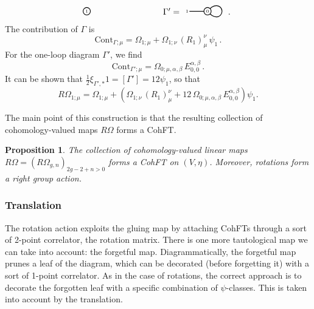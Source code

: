 \documentclass[11pt,reqno]{amsart}
\numberwithin{equation}{section}
\newcommand{\mr}[1]{\mathrm{#1}}
\theoremstyle{plain}
\newtheorem{proposition}[theorem]{Proposition}
\theoremstyle{definition}
\begin{document}
\begin{itemize}
\begin{equation}
\begin{tikzpicture}[baseline,scale=.5]
      \draw[thick,fill=white] (0,0) circle[radius=.3cm];
      \node at (0,0) {\tiny$1$};

      \begin{scope}[xshift = 10cm]
        \node at (-3,0) {$\Gamma'=$};
        \draw[thick] (0,0) -- (180:1.5);
        \node at (180:1.7) {\tiny$1$};
      
        \draw[thick,rotate=-90] (0,0) to[out=45,in=-90] (.45,.75) to[out=90,in=0] (0,1.2) to[out=180,in=90] (-.45,.75) to[out=-90,in=135] (0,0);

        \draw[thick,fill=white] (0,0) circle[radius=.3cm];
        \node at (0,0) {\tiny$0$};

        \node at (1.8,0) {$\vphantom{\Gamma'=}$.};
      \end{scope}
    \end{tikzpicture}
  \end{equation}
  The contribution of $\Gamma$ is
  \begin{equation}
    \mr{Cont}_{\Gamma;\mu} = \Omega_{1;\mu} + \Omega_{1;\nu} \, (R_1)_{\mu}^{\nu} \, \psi_1 \,.
  \end{equation}
  For the one-loop diagram $\Gamma'$, we find
  \begin{equation}
    \mr{Cont}_{\Gamma';\mu} = \Omega_{0;\mu,\alpha,\beta} \, E^{\alpha,\beta}_{0,0} \,.
  \end{equation}
  It can be shown that $\tfrac{1}{2} \xi_{\Gamma',\ast} 1 = [\Gamma'] = 12 \psi_1$, so that
  \begin{equation}
    R\Omega_{1;\mu}
    =
    \Omega_{1;\mu} + \left( \Omega_{1;\nu} \, (R_1)_{\mu}^{\nu} + 12 \, \Omega_{0;\mu,\alpha,\beta} \, E^{\alpha,\beta}_{0,0} \right) \psi_1.
  \end{equation}
\end{itemize}

The main point of this construction is that the resulting collection of cohomology-valued maps $R\Omega$ forms a CohFT.

\begin{proposition}
  The collection of cohomology-valued linear maps $R\Omega = (R\Omega_{g,n})_{2g-2+n > 0}$ forms a CohFT on $(V,\eta)$. Moreover, rotations form a right group action.
\end{proposition}

\subsubsection{Translation}
The rotation action exploits the gluing map by attaching CohFTs through a sort of 2-point correlator, the rotation matrix. There is one more tautological map we can take into account: the forgetful map. Diagrammatically, the forgetful map prunes a leaf of the diagram, which can be decorated (before forgetting it) with a sort of 1-point correlator. As in the case of rotations, the correct approach is to decorate the forgotten leaf with a specific combination of $\psi$-classes. This is taken into account by the translation.
\end{document}
